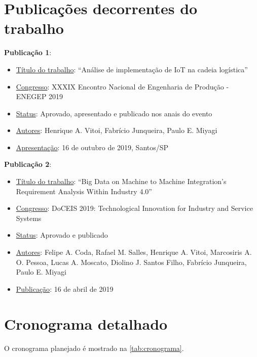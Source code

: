 \chapter{Publicações decorrentes do trabalho}


	\textbf{Publicação 1}:
	\begin{itemize}
		\item \underline{Título do trabalho}: “Análise de implementação de IoT na cadeia logística”
		\item \underline{Congresso}: XXXIX Encontro Nacional de Engenharia de Produção - ENEGEP 2019
		\item \underline{Status}: Aprovado, apresentado e publicado nos anais do evento
		\item \underline{Autores}:  Henrique A. Vitoi, Fabrício Junqueira, Paulo E. Miyagi
		\item \underline{Apresentação}: 16 de outubro de 2019, Santos/SP
	\end{itemize}
	
	\bigskip

	\textbf{Publicação 2}:
	\begin{itemize}
		\item \underline{Título do trabalho}: “Big Data on Machine to Machine Integration's Requirement Analysis Within Industry 4.0”
		\item \underline{Congresso}: DoCEIS 2019: Technological Innovation for Industry and Service Systems
		\item \underline{Status}: Aprovado e publicado
		\item \underline{Autores}:  Felipe A. Coda, Rafael M. Salles, Henrique A. Vitoi, Marcosiris A. O. Pessoa, Lucas A. Moscato, Diolino J. Santos Filho, Fabrício Junqueira, Paulo E. Miyagi
		\item \underline{Publicação}: 16 de abril de 2019
	\end{itemize}


\chapter{Cronograma detalhado}

	O cronograma planejado é mostrado na \autoref{tab:cronograma}.
	
